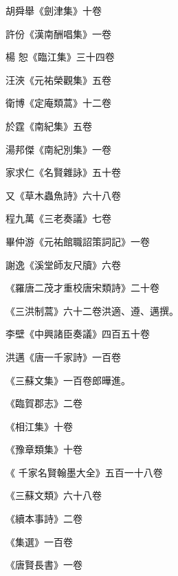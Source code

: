 \begin{pinyinscope}
 胡舜舉《劍津集》十卷



 許份《漢南酬唱集》一卷



 楊
 恕《臨江集》三十四卷



 汪浹《元祐榮觀集》五卷



 衛博《定庵類蒿》十二卷



 於霆《南紀集》五卷



 湯邦傑《南紀別集》一卷



 家求仁《名賢雜詠》五十卷



 又《草木蟲魚詩》六十八卷



 程九萬《三老奏議》七卷



 畢仲游《元祐館職詔策詞記》一卷



 謝逸《溪堂師友尺牘》六卷



 《羅唐二茂才重校唐宋類詩》二十卷



 《三洪制蒿》六十二卷洪適、遵、邁撰。



 李壁《中興諸臣奏議》四百五十卷



 洪邁《唐一千家詩》一百卷



 《三蘇文集》一百卷郎曄進。



 《臨賀郡志》二卷



 《相江集》十卷



 《豫章類集》十卷



 《
 千家名賢翰墨大全》五百一十八卷



 《三蘇文類》六十八卷



 《續本事詩》二卷



 《集選》一百卷



 《唐賢長書》一卷




\end{pinyinscope}
